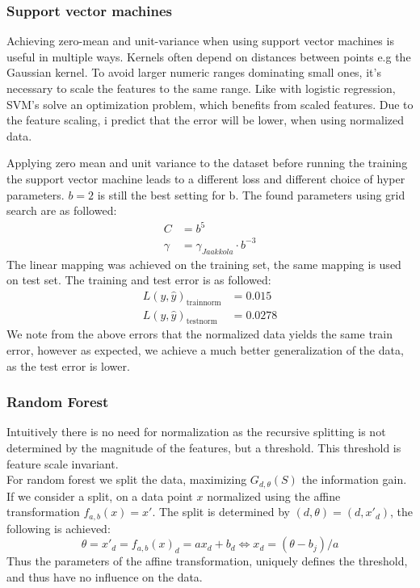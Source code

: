 \documentclass{article}
\begin{document}
\subsubsection{Support vector machines}
Achieving zero-mean and unit-variance when using support vector machines is useful in multiple ways. Kernels often depend on distances between points e.g the Gaussian kernel. To avoid larger numeric ranges dominating small ones, it's necessary to scale the features to the same range. Like with logistic regression, SVM's solve an optimization problem, which benefits from scaled features. Due to the feature scaling, i predict that the error will be lower, when using normalized data.
%

Applying zero mean and unit variance to the dataset before running the training the support vector machine leads to a different loss and different choice of hyper parameters. $b=2$ is still the best setting for b. The found parameters using grid search are as followed:
\begin{align*}
C &= b^5 \\
\gamma &= \gamma_{Jaakkola} \cdot b^{-3}
\end{align*}
The linear mapping was achieved on the training set, the same mapping is used on test set. The training and test error is as followed:
\begin{align*}
L(y,\hat{y})_{\text{trainnorm}} &= 0.015 \\
L(y,\hat{y})_{\text{testnorm}} &= 0.0278
\end{align*}
We note from the above errors that the normalized data yields the same train error, however as expected, we achieve a much better generalization of the data, as the test error is lower.
\subsubsection{Random Forest}
Intuitively there is no need for normalization as the recursive splitting is not determined by the magnitude of the features, but a threshold. This threshold is feature scale invariant. \\
For random forest we split the data, maximizing $G_{d,\theta}(S)$ the information gain. If we consider a split, on a data point $x$ normalized using the affine transformation  $f_{a,b}(x) = x'$. The split is determined by $(d,\theta)=(d,x'_d)$, the following is achieved:
\begin{equation}
\theta = x'_d = f_{a,b}(x)_d = ax_d + b_d \Leftrightarrow
x_d = (\theta -b_j)/a
\end{equation}
Thus the parameters of the affine transformation, uniquely defines the threshold, and thus have no influence on the data.
\end{document}
